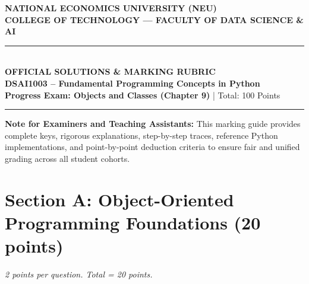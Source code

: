 \documentclass[11pt,a4paper]{article}
\begin{document}
\begin{center}
  {\Large\textbf{NATIONAL ECONOMICS UNIVERSITY (NEU)}}\\[0.05cm]
  {\large\textbf{COLLEGE OF TECHNOLOGY --- FACULTY OF DATA SCIENCE \& AI}}\\[0.15cm]
  \rule{\textwidth}{1pt}\\[0.2cm]
  {\LARGE\bfseries\color{primaryblue}OFFICIAL SOLUTIONS \& MARKING RUBRIC}\\[0.1cm]
  {\large\textbf{DSAI1003 -- Fundamental Programming Concepts in Python}}\\[0.05cm]
  {\normalsize\textbf{Progress Exam: Objects and Classes (Chapter 9)} \quad | \quad Total: 100 Points}\\[0.15cm]
  \rule{\textwidth}{0.5pt}
\end{center}

\begin{tcolorbox}[colback=green!6, colframe=correctgreen, arc=1.5mm, top=1mm, bottom=1mm]
\small
\textbf{Note for Examiners and Teaching Assistants:}
This marking guide provides complete keys, rigorous explanations, step-by-step traces, reference Python implementations, and point-by-point deduction criteria to ensure fair and unified grading across all student cohorts.
\end{tcolorbox}

\vspace{0.1cm}
\section*{Section A: Object-Oriented Programming Foundations (20 points)}
\textit{2 points per question. Total = 20 points.}
\end{document}
